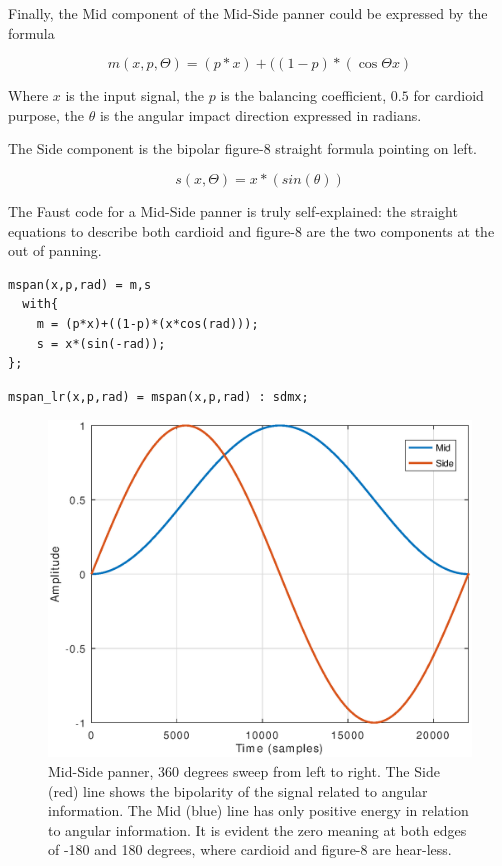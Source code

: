 \documentclass{article}
\begin{document}
Finally, the Mid component of the Mid-Side panner could be expressed by the formula

\begin{equation}
m(x,p,\Theta) = (p*x) + ((1-p)*(\cos\Theta x)
\label{eq:mid}
\end{equation}

Where $x$ is the input signal, the $p$ is the balancing coefficient, $0.5$ for cardioid purpose, the $\theta$ is the angular impact direction expressed in radians.

The Side component is the bipolar figure-8 straight formula pointing on left.

\begin{equation}
s(x,\Theta) = x*(sin(\theta))
\label{eq:mid}
\end{equation}

The Faust code for a Mid-Side panner is truly self-explained: the straight equations to describe both cardioid and figure-8 are the two components at the out of panning.

\begin{lstlisting}
mspan(x,p,rad) = m,s
  with{
    m = (p*x)+((1-p)*(x*cos(rad)));
    s = x*(sin(-rad));
};
\end{lstlisting}

\begin{lstlisting}
mspan_lr(x,p,rad) = mspan(x,p,rad) : sdmx;
\end{lstlisting}

\begin{figure}[h]
\centering
\includegraphics[width=1\columnwidth]{mspan}
\caption{Mid-Side panner, 360 degrees sweep from left to right. The Side (red) line shows the bipolarity of the signal related to angular information. The Mid (blue) line has only positive energy in relation to angular information. It is evident the zero meaning at both edges of -180 and 180 degrees, where cardioid and figure-8 are hear-less.}
\label{fig:mspan}
\end{figure}
\end{document}
